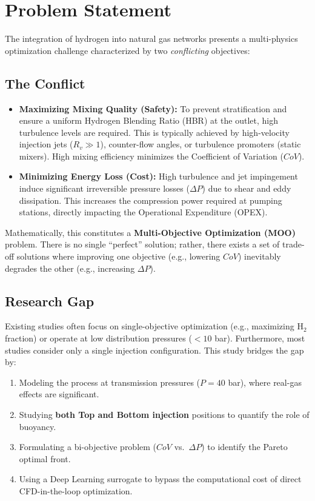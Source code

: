 \documentclass[12pt, a4paper]{report}
\begin{document}
\section{Problem Statement}
The integration of hydrogen into natural gas networks presents a multi-physics optimization challenge characterized by two \textit{conflicting} objectives:

\subsection{The Conflict}
\begin{itemize}
    \item \textbf{Maximizing Mixing Quality (Safety):} To prevent stratification and ensure a uniform Hydrogen Blending Ratio (HBR) at the outlet, high turbulence levels are required. This is typically achieved by high-velocity injection jets ($R_v \gg 1$), counter-flow angles, or turbulence promoters (static mixers). High mixing efficiency minimizes the Coefficient of Variation ($CoV$).
    \item \textbf{Minimizing Energy Loss (Cost):} High turbulence and jet impingement induce significant irreversible pressure losses ($\Delta P$) due to shear and eddy dissipation. This increases the compression power required at pumping stations, directly impacting the Operational Expenditure (OPEX).
\end{itemize}

Mathematically, this constitutes a \textbf{Multi-Objective Optimization (MOO)} problem. There is no single ``perfect'' solution; rather, there exists a set of trade-off solutions where improving one objective (e.g., lowering $CoV$) inevitably degrades the other (e.g., increasing $\Delta P$).

\subsection{Research Gap}
Existing studies \cite{Su2022, Arya2023} often focus on single-objective optimization (e.g., maximizing H$_2$ fraction) or operate at low distribution pressures ($<10$ bar). Furthermore, most studies consider only a single injection configuration. This study bridges the gap by:
\begin{enumerate}
    \item Modeling the process at transmission pressures ($P = 40$ bar), where real-gas effects are significant.
    \item Studying \textbf{both Top and Bottom injection} positions to quantify the role of buoyancy.
    \item Formulating a bi-objective problem ($CoV$ vs.\ $\Delta P$) to identify the Pareto optimal front.
    \item Using a Deep Learning surrogate to bypass the computational cost of direct CFD-in-the-loop optimization.
\end{enumerate}
\end{document}
